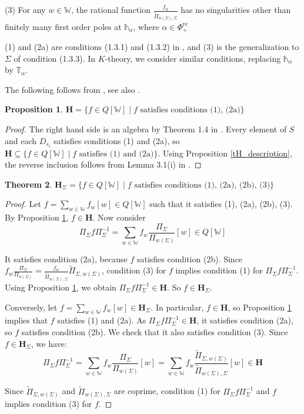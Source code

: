 \documentclass[11pt]{article}
\renewcommand{\H}{\textbf{H}}
\newcommand{\1}{\mathbb{1}}
\renewcommand{\th}{\mathbb{h}}
\newcommand{\tW}{\mathbb{W}}
\newcommand{\tT}{\mathbb{T}}
\newcommand{\tPi}{\widetilde{\Pi}}
\newcommand{\bbPhire}{\mathbb{\Phi}^\text{re}}
\renewcommand{\subset}{\subseteq}
\newtheorem{theorem}{Theorem}[section]
\newtheorem{proposition}[theorem]{Proposition}
\theoremstyle{definition}
\numberwithin{equation}{section}
\begin{document}
(3) For any $w\in \tW$, the rational function $\frac{f_w}{\tPi_{w(\Sigma),\Sigma}}$ has no singularities other than finitely many first order poles at $\th_{\alpha}$, where $\alpha \in \bbPhire_+$

(1) and (2a) are conditions (1.3.1) and (1.3.2) in \cite{GKV}, and (3) is the generalization to $\Sigma$ of condition (1.3.3). In $K$-theory, we consider similar conditions, replacing $\th_\alpha$ by $\tT_\alpha$.

\noindent The following follows from \cite{GKV}, see also \cite[3(vi)]{FT}.

\begin{proposition}
\label{tH_(1)(2)}
    $\H = \{ f\in Q[\tW] \mid f\text{ satisfies conditions (1), (2a)} \}$
\end{proposition}

\begin{proof}
    The right hand side is an algebra by Theorem 1.4 in \cite{GKV}. Every element of $S$ and each $D_{s_i}$ satisfies conditions (1) and (2a), so $\H \subset \{ f\in Q[\tW] \mid f\text{ satisfies (1) and (2a)} \}$. Using Proposition \ref{tH_description}, the reverse inclusion follows from Lemma 3.1(i) in \cite{GKV}.
\end{proof}

\begin{theorem}
\label{H_Sigma_(1)(2)(3)}
    $\H_\Sigma = \{ f \in Q[\tW] \mid f \text{ satisfies conditions (1), (2a), (2b), (3)}\}$
\end{theorem}

\begin{proof}
    Let $f = \sum_{w\in \tW} f_w [w] \in Q[\tW]$ such that it satisfies (1), (2a), (2b), (3). By Proposition \ref{tH_(1)(2)}, $f\in \H$. Now consider
    $$\Pi_\Sigma f \Pi_\Sigma^{-1} = \sum_{w\in \tW} f_w \frac{\Pi_\Sigma}{\Pi_{w(\Sigma)}} [w] \in Q[\tW]$$

    \noindent It satisfies condition (2a), because $f$ satisfies condition (2b). Since $f_w\frac{\Pi_\Sigma}{\Pi_{w(\Sigma)}} = \frac{f_w}{\tPi_{w(\Sigma),\Sigma}} \tPi_{\Sigma,w(\Sigma)}$, condition (3) for $f$ implies condition (1) for $\Pi_\Sigma f \Pi_\Sigma^{-1}$. Using Proposition \ref{tH_(1)(2)}, we obtain $\Pi_\Sigma f \Pi_\Sigma^{-1} \in \H$. So $f \in \H_\Sigma$.

    Conversely, let $f = \sum_{w\in \tW} f_w [w] \in \H_\Sigma$. In particular, $f\in \H$, so Proposition \ref{tH_(1)(2)} implies that $f$ satisfies (1) and (2a). As $\Pi_\Sigma f \Pi_\Sigma^{-1} \in \H$, it satisfies condition (2a), so $f$ satisfies condition (2b). We check that it also satisfies condition (3). Since $f\in\H_\Sigma$, we have:
    $$\Pi_\Sigma f \Pi_\Sigma^{-1} = \sum_{w\in \tW} f_w \frac{\Pi_\Sigma}{\Pi_{w(\Sigma)}}[w] =  \sum_{w\in \tW} f_w \frac{\tPi_{\Sigma, w(\Sigma)}}{\tPi_{w(\Sigma), \Sigma}}[w] \in \H$$
    
    Since $\tPi_{\Sigma, w(\Sigma)}$ and $\tPi_{w(\Sigma), \Sigma}$ are coprime, condition (1) for $\Pi_\Sigma f \Pi_\Sigma^{-1}$ and $f$ implies condition (3) for $f$.
\end{proof}
\end{document}
